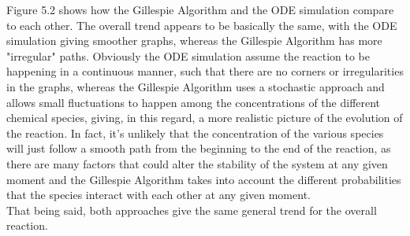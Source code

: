 Figure 5.2 shows how the Gillespie Algorithm and the ODE simulation compare to each other. The overall trend appears to be basically the same, with the ODE simulation giving smoother graphs, whereas the Gillespie Algorithm has more "irregular" paths. Obviously the ODE simulation assume the reaction to be happening in a continuous manner, such that there are no corners or irregularities in the graphs, whereas the Gillespie Algorithm uses a stochastic approach and allows small fluctuations to happen among the concentrations of the different chemical species, giving, in this regard, a more realistic picture of the evolution of the reaction. In fact, it's unlikely that the concentration of the various species will just follow a smooth path from the beginning to the end of the reaction, as there are many factors that could alter the stability of the system at any given moment and the Gillespie Algorithm takes into account the different probabilities that the species interact with each other at any given moment.\\
That being said, both approaches give the same general trend for the overall reaction.

